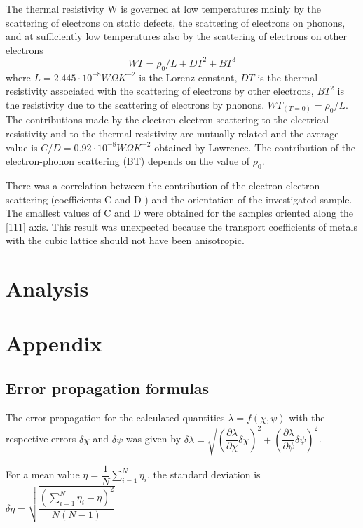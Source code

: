 \documentclass[openany,11pt,a4paper]{report}
\begin{document}
The thermal resistivity W is governed at low temperatures mainly by the scattering of electrons on static defects, the scattering of electrons on phonons, and at sufficiently
low temperatures also by the scattering of electrons on other electrons
\begin{equation}
WT=\rho_{0}/L + DT^{2}+ BT^{3}
\end{equation}
where $L = 2.445 \cdot 10^{-8} W\Omega K^{-2}$ is the Lorenz constant, $DT$ is the thermal resistivity associated with the scattering of electrons
by other electrons, $BT^{2}$ is the resistivity due to the scattering of electrons by phonons.  $WT_{(T=0)}= \rho_{0}/L $. The contributions made by the electron-electron scattering
to the electrical resistivity and to the thermal resistivity are mutually related and the average value is $C/D = 0.92\cdot 10^{-8} W\Omega K^{-2}$ obtained by Lawrence. The contribution of the electron-phonon scattering (BT) depends on the value of $\rho_{0}$.

There was a correlation between the
contribution of the electron-electron scattering (coefficients C and D ) and the orientation of the investigated sample. The smallest values of C and D were obtained for the samples
oriented along the [111] axis. This result was unexpected because the transport coefficients of metals with the cubic lattice should not have been anisotropic.

\chapter{Analysis}

\chapter{Appendix}

\section{Error propagation formulas}

The error propagation for the calculated quantities $\lambda = f(\chi ,\psi)$ with the respective errors $ \delta\chi$ and $ \delta\psi$ was given by $\delta\lambda = \sqrt{(\dfrac{\partial \lambda}{\partial \chi} \delta\chi)^{2}+(\dfrac{\partial \lambda}{\partial \psi} \delta\psi)^{2}}$.\

For a mean value $ \eta =\dfrac{1}{N} \sum_{i=1}^{N} \eta _{i} $, the standard deviation is $\delta \eta = \sqrt{\dfrac{(\sum_{i=1}^{N} \eta _{i}- \eta  )^{2}}{N(N-1)}}$
\end{document}
